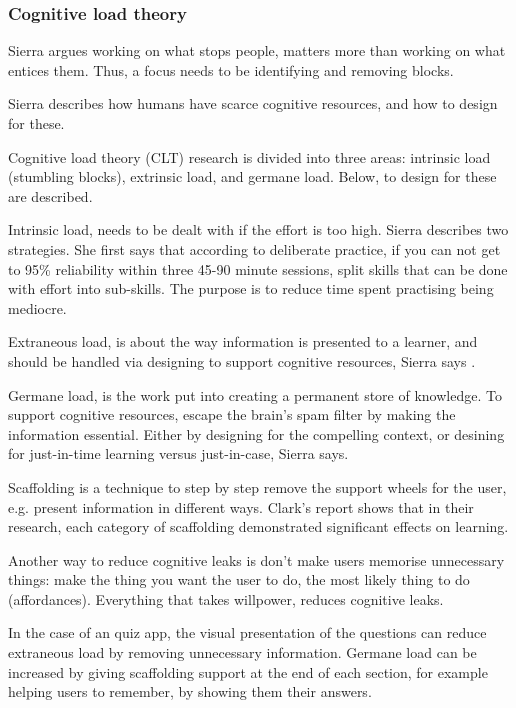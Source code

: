 \subsubsection{Cognitive load theory}

Sierra argues working on what stops people, matters more than working on what entices them. Thus, a focus needs to be identifying and removing blocks.

Sierra \citep{sierra} describes how humans have scarce cognitive resources, and how to design for these.

Cognitive load theory (CLT) research is divided into three areas: intrinsic load (stumbling blocks), extrinsic load, and germane load. Below, to design for these are described.

Intrinsic load, needs to be dealt with if the effort is too high. Sierra \citep{sierra}describes two strategies. She first says that according to deliberate practice, if you can not get to 95\% reliability within three 45-90 minute sessions, split skills that can be done with effort into sub-skills. The purpose is to reduce time spent practising being mediocre.

Extraneous load, is about the way information is presented to a learner, and should be handled via designing to support cognitive resources, Sierra says \citep{sierra}.

Germane load, is the work put into creating a permanent store of knowledge. To support cognitive resources, escape the brain's spam filter by making the information essential. Either by designing for the compelling context, or desining for just-in-time learning versus just-in-case, Sierra says. \citep{sierra}

Scaffolding is a technique to step by step remove the support wheels for the user, e.g. present information in different ways. Clark's \citep{gates} report shows that in their research, each category of scaffolding demonstrated significant effects on learning.

Another way to reduce cognitive leaks is don't make users memorise unnecessary things: make the thing you want the user to do, the most likely thing to do (affordances). Everything that takes willpower, reduces cognitive leaks.

In the case of an quiz app, the visual presentation of the questions can reduce extraneous load by removing unnecessary information. Germane load can be increased by giving scaffolding support at the end of each section, for example helping users to remember, by showing them their answers.

